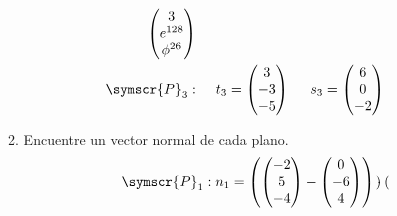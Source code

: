 \documentclass{article}
\def\fancyP{\symscr{P}}
\begin{document}
\begin{enumerate}
\begin{enumerate}[label=\listAlph]
\[\begin{aligned}
\begin{pmatrix}
                        3 \\ e^{128} \\ \phi^{26}
                    \end{pmatrix}
                    \\
                    \fancyP_3:&
                    \hspace{0.5cm}
                    t_3 = \begin{pmatrix}
                        3 \\ -3 \\ -5
                    \end{pmatrix}
                    \hspace{0.5cm}
                    s_3 = \begin{pmatrix}
                        6 \\ 0 \\ -2
                    \end{pmatrix}
                \end{aligned}
            \]
		\item Encuentre un vector normal de cada plano.
            \[
                \fancyP_1:
                n_1 = 
                \left(
                \begin{pmatrix}
                    -2 \\ 5 \\ -4
                \end{pmatrix}
                -
                \begin{pmatrix}
                    0 \\ -6 \\ 4
                \end{pmatrix}
                \right)
                \cdot
                \begin{pmatrix}
                

\end{pmatrix}\]
\end{enumerate}
\end{enumerate}
\end{document}
